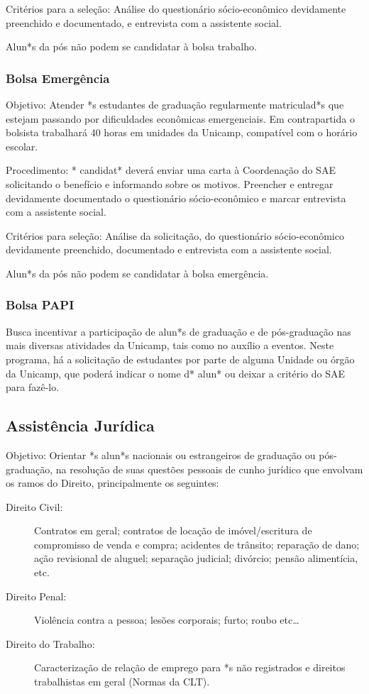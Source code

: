 Critérios para a seleção: Análise do questionário sócio-econômico devidamente
preenchido e documentado, e entrevista com a assistente social.

Alun*s da pós não podem se candidatar à bolsa trabalho.

\subsubsection{Bolsa Emergência}

Objetivo: Atender *s estudantes de graduação regularmente matriculad*s que
estejam passando por dificuldades econômicas emergenciais. Em contrapartida o
bolsista trabalhará 40 horas em unidades da Unicamp, compatível com o horário
escolar.

Procedimento: * candidat* deverá enviar uma carta à Coordenação do SAE
solicitando o benefício e informando sobre os motivos. Preencher e entregar
devidamente documentado o questionário sócio-econômico e marcar entrevista com a
assistente social.

Critérios para seleção: Análise da solicitação, do questionário sócio-econômico
devidamente preenchido, documentado e entrevista com a assistente social.

Alun*s da pós não podem se candidatar à bolsa emergência.

\subsubsection{Bolsa PAPI}

Busca incentivar a participação de alun*s de graduação e de pós-graduação nas
mais diversas atividades da Unicamp, tais como no auxílio a eventos. Neste
programa, há a solicitação de estudantes por parte de alguma Unidade ou órgão da
Unicamp, que poderá indicar o nome d* alun* ou deixar a critério do SAE para
fazê-lo.

\subsection{Assistência Jurídica}

Objetivo: Orientar *s alun*s nacionais ou estrangeiros de graduação ou
pós-graduação, na resolução de suas questões pessoais de cunho jurídico que
envolvam os ramos do Direito, principalmente os seguintes:

\begin{description}
    \item[Direito Civil:] Contratos em geral; contratos de locação de
        imóvel/escritura de compromisso de venda e compra; acidentes de
        trânsito; reparação de dano; ação revisional de aluguel; separação
        judicial; divórcio; pensão alimentícia, etc.

    \item[Direito Penal:] Violência contra a pessoa; lesões corporais; furto;
        roubo etc{\dots}

    \item[Direito do Trabalho:] Caracterização de relação de emprego para *s não
        registrados e direitos trabalhistas em geral (Normas da CLT).
\end{description}

